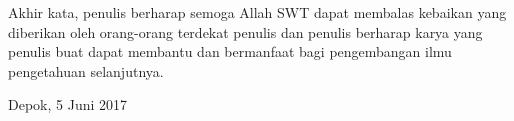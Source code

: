 Akhir kata, penulis berharap semoga Allah SWT dapat membalas kebaikan yang diberikan oleh orang-orang terdekat penulis dan penulis berharap karya yang penulis buat dapat membantu dan bermanfaat bagi pengembangan ilmu pengetahuan selanjutnya.

\vspace*{0.1cm}
\begin{flushright}
Depok, 5 Juni 2017\\[0.1cm]
\vspace*{1cm}
\penulis

\end{flushright}